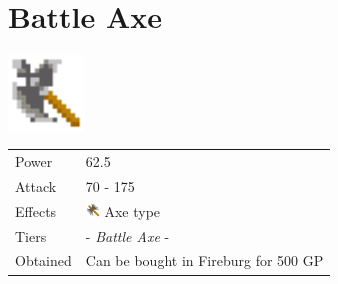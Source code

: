\section{Battle Axe}
\label{weapon:battle_axe}

\includegraphics[height=2cm,keepaspectratio]{./resources/weapons/battleaxe}

\begin{longtable}{ l p{9cm} }
	Power
	& 62.5
\\ %
	Attack
	& 70 - 175
\\ %
	Effects
	& \includegraphics[height=1em,keepaspectratio]{./resources/effects/axe}
	Axe type
\\ %
	Tiers
	& \nameref{weapon:axe} - \textit{Battle Axe} - \nameref{weapon:giants_axe}
\\ %
	Obtained
	& Can be bought in Fireburg for 500 GP
\end{longtable}
